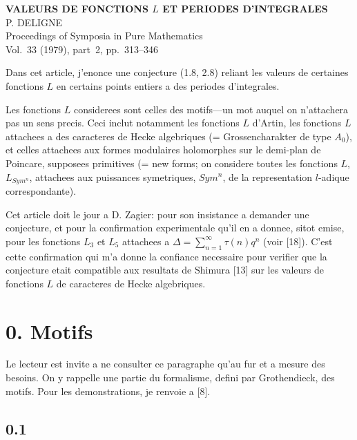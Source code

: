 \documentclass[12pt,a4paper]{article}
\theoremstyle{plain}
\theoremstyle{definition}
\theoremstyle{remark}
\begin{document}
\thispagestyle{empty}

\begin{center}
{\large\bfseries VALEURS DE FONCTIONS $L$ ET PERIODES D'INTEGRALES}\\[1em]
P. DELIGNE\\[1em]
Proceedings of Symposia in Pure Mathematics\\
Vol.~33 (1979), part~2, pp.~313--346
\end{center}

\vspace{1em}


Dans cet article, j'enonce une conjecture (1.8, 2.8) reliant les valeurs de
certaines fonctions $L$ en certains points entiers a des periodes d'integrales.

Les fonctions $L$ considerees sont celles des motifs---un mot auquel on n'attachera
pas un sens precis. Ceci inclut notamment les fonctions $L$ d'Artin, les fonctions $L$
attachees a des caracteres de Hecke algebriques (= Grossencharakter de type $A_0$),
et celles attachees aux formes modulaires holomorphes sur le demi-plan de Poincare,
supposees primitives (= new forms; on considere toutes les fonctions $L$,
$L_{Sym^n}$, attachees aux puissances symetriques, $Sym^n$, de la representation
$l$-adique correspondante).

Cet article doit le jour a D. Zagier: pour son insistance a demander une conjecture,
et pour la confirmation experimentale qu'il en a donnee, sitot emise, pour les
fonctions $L_3$ et $L_5$ attachees a $\Delta = \sum_{n=1}^{\infty} \tau(n)q^n$
(voir [18]). C'est cette confirmation qui m'a donne la confiance necessaire pour
verifier que la conjecture etait compatible aux resultats de Shimura [13] sur les
valeurs de fonctions $L$ de caracteres de Hecke algebriques.

\section*{0. Motifs}

Le lecteur est invite a ne consulter ce paragraphe qu'au fur et a mesure des besoins.
On y rappelle une partie du formalisme, defini par Grothendieck, des motifs. Pour les
demonstrations, je renvoie a [8].

\subsection*{0.1}
\end{document}
